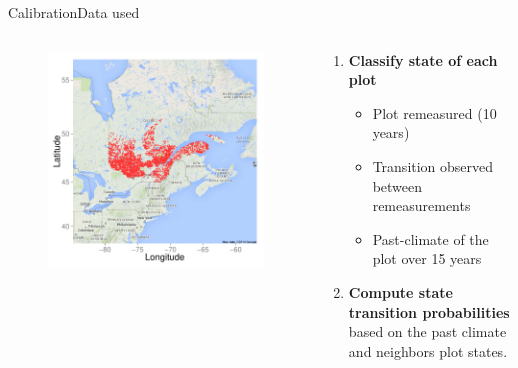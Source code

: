 \documentclass[10pt,aspectratio=149]{beamer}
\begin{document}
\begin{frame}{Calibration}{Data used}
	
	\begin{columns}[c]
	\begin{column}[c]{.45\paperwidth}
		\begin{figure}
			\includegraphics[width=.45\paperwidth]{Figs/carto.pdf}
		\end{figure}
	\end{column}
	\begin{column}[l]{.50\paperwidth}

	\begin{enumerate}
			\item \textbf{Classify state of each plot}
		\begin{itemize}
			\item Plot remeasured (10 years)
			\item Transition observed between remeasurements
			\item Past-climate of the plot over 15 years
		\end{itemize}
			\item \textbf{Compute state transition probabilities} based on the past climate and neighbors plot states.
	\end{enumerate}

	\end{column}
\end{columns}

\end{frame}
\end{document}

